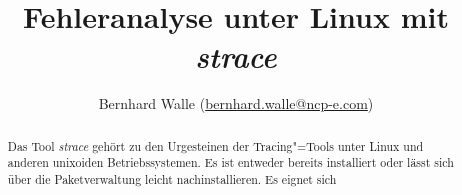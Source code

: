 \documentclass[10pt,DIV=14,twocolumn,ngerman,parskip=half]{scrartcl}
\begin{document}
\title{Fehleranalyse unter Linux mit \emph{strace}}

\author{Bernhard Walle (\url{bernhard.walle@ncp-e.com})}

\maketitle

\begin{abstract}
    Das Tool \emph{strace} gehört zu den Urgesteinen der Tracing"=Tools unter Linux und anderen unixoiden Betriebssystemen. Es ist entweder bereits installiert oder lässt sich über die
    Paketverwaltung leicht nachinstallieren. Es eignet sich 
\end{abstract}



    
\end{document}
